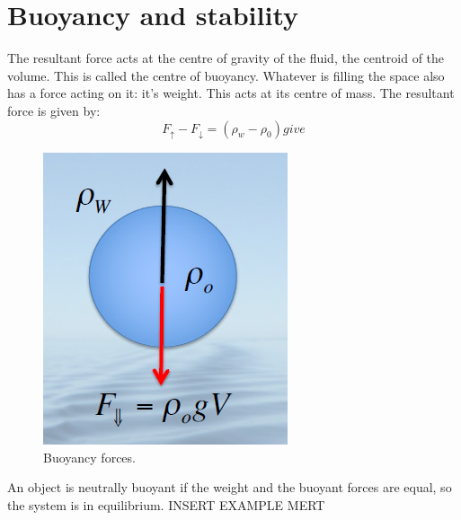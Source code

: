 \documentclass[class=report, crop=false, 12pt,a4paper]{standalone}
\numberwithin{equation}{section}
\begin{document}
\section{Buoyancy and stability}
The resultant force acts at the centre of gravity of the fluid, the centroid of the volume. This is called the centre of buoyancy. Whatever is filling the space also has a force acting on it: it's weight. This acts at its centre of mass. The resultant force is given by: 
\begin{equation}
  F_\uparrow - F_\downarrow = (\rho_w - \rho_0) give
\end{equation}
\begin{figure}[h!]
  \centering
  \includegraphics[width = 0.4 \textwidth]{../img/BuoyancyForces}
  \caption{Buoyancy forces.}
\end{figure}
An object is neutrally buoyant if the weight and the buoyant forces are equal, so the system is in equilibrium. INSERT EXAMPLE MERT
\end{document}

